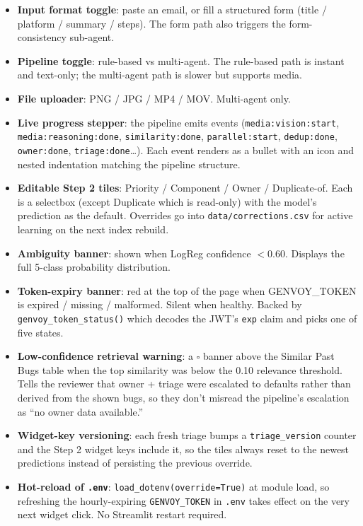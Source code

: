 \documentclass[11pt,a4paper]{article}
\begin{document}
\begin{itemize}[leftmargin=1.4em,nosep]
\item \textbf{Input format toggle}: paste an email, or fill a structured
      form (title / platform / summary / steps). The form path also
      triggers the form-consistency sub-agent.
\item \textbf{Pipeline toggle}: rule-based vs multi-agent. The rule-based
      path is instant and text-only; the multi-agent path is slower but
      supports media.
\item \textbf{File uploader}: PNG / JPG / MP4 / MOV. Multi-agent only.
\item \textbf{Live progress stepper}: the pipeline emits events
      (\texttt{media:vision:start}, \texttt{media:reasoning:done},
      \texttt{similarity:done}, \texttt{parallel:start},
      \texttt{dedup:done}, \texttt{owner:done}, \texttt{triage:done}\ldots).
      Each event renders as a bullet with an icon and nested indentation
      matching the pipeline structure.
\item \textbf{Editable Step 2 tiles}: Priority / Component / Owner /
      Duplicate-of. Each is a selectbox (except Duplicate which is
      read-only) with the model's prediction as the default. Overrides go
      into \texttt{data/corrections.csv} for active learning on the next
      index rebuild.
\item \textbf{Ambiguity banner}: shown when LogReg confidence $<0.60$.
      Displays the full 5-class probability distribution.
\item \textbf{Token-expiry banner}: red at the top of the page when
      GENVOY\_TOKEN is expired / missing / malformed. Silent when
      healthy. Backed by \texttt{genvoy\_token\_status()} which decodes
      the JWT's \texttt{exp} claim and picks one of five states.
\item \textbf{Low-confidence retrieval warning}: a $\square$ banner
      above the Similar Past Bugs table when the top similarity was
      below the 0.10 relevance threshold. Tells the reviewer that
      owner + triage were escalated to defaults rather than derived
      from the shown bugs, so they don't misread the pipeline's
      escalation as ``no owner data available.''
\item \textbf{Widget-key versioning}: each fresh triage bumps a
      \texttt{triage\_version} counter and the Step 2 widget keys
      include it, so the tiles always reset to the newest predictions
      instead of persisting the previous override.
\item \textbf{Hot-reload of \texttt{.env}}: \texttt{load\_dotenv(override=True)}
      at module load, so refreshing the hourly-expiring \texttt{GENVOY\_TOKEN}
      in \texttt{.env} takes effect on the very next widget click. No
      Streamlit restart required.
\end{itemize}
\end{document}
